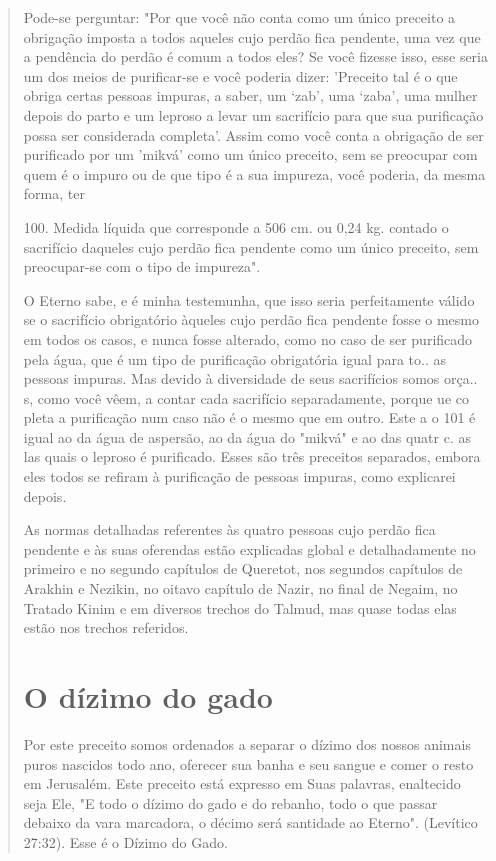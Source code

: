\begin{quote}
Pode-se perguntar: "Por que você não conta como um único pre­ceito a
obrigação imposta a todos aqueles cujo perdão fica pendente, uma vez que
a pendência do perdão é comum a todos eles? Se você fizesse isso, esse
seria um dos meios de purificar-se e você poderia dizer: 'Preceito tal é
o que obriga certas pessoas impuras, a saber, um `zab', uma `zaba', uma
mulher de­pois do parto e um leproso a levar um sacrifício para que sua
purificação possa ser considerada completa'. Assim como você conta a
obrigação de ser purifica­do por um 'mikvá' como um único preceito, sem
se preocupar com quem é o impuro ou de que tipo é a sua impureza, você
poderia, da mesma forma, ter

100. Medida líquida que corresponde a 506 cm. ou 0,24
kg.
contado o sacrifício daqueles cujo perdão fica pendente como um único
pre­ceito, sem preocupar-se com o tipo de impureza".

O Eterno sabe, e é minha testemunha, que isso seria perfeitamente válido
se o sacrifício obrigatório àqueles cujo perdão fica pendente fosse o
mes­mo em todos os casos, e nunca fosse alterado, como no caso de ser
purificado pela água, que é um tipo de purificação obrigatória igual
para to.. as pessoas impuras. Mas devido à diversidade de seus
sacrifícios somos orça.. s, como você vêem, a contar cada sacrifício
separadamente, porque ue co pleta a purificação num caso não é o mesmo
que em outro. Este a o 101 é igual ao da água de aspersão, ao da água do
"mikvá" e ao das quatr c. as las quais o leproso é purificado. Esses são
três preceitos separados, embora eles todos se refiram à purificação de
pessoas impuras, como explicarei depois.

As normas detalhadas referentes às quatro pessoas cujo perdão fica
pendente e às suas oferendas estão explicadas global e detalhadamente no
pri­meiro e no segundo capítulos de Queretot, nos segundos capítulos de
Arakhin e Nezikin, no oitavo capítulo de Nazir, no final de Negaim, no
Tratado Kinim e em diversos trechos do Talmud, mas quase todas elas
estão nos trechos referidos.

\section{O dízimo do gado}

Por este preceito somos ordenados a separar o dízimo dos nossos animais
puros nascidos todo ano, oferecer sua banha e seu sangue e comer o resto
em Jerusalém. Este preceito está expresso em Suas palavras, enaltecido
seja Ele, "E todo o dízimo do gado e do rebanho, todo o que passar
debaixo da vara marcadora, o décimo será santidade ao Eterno". (Levítico
27:32). Esse é o Dízimo do Gado.
\end{quote}

